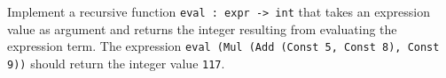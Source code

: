 Implement a recursive function \lstinline{eval : expr -> int} that takes an
expression value as argument and returns the integer resulting from
evaluating the expression term. The expression \lstinline{eval (Mul (Add (Const 5, Const 8), Const 9))} should return the integer value \lstinline{117}.
